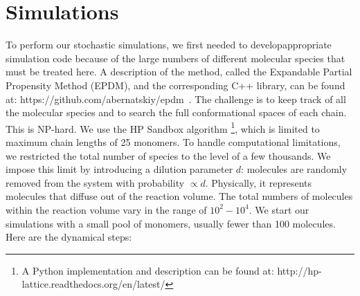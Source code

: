 \documentclass[5p,times]{elsarticle}
\begin{document}
 \section{Simulations}
To perform our stochastic simulations, we first needed to developappropriate simulation code 
because of the large numbers of different molecular species that must be treated here.  A 
description of the method, called the Expandable Partial Propensity Method (EPDM), and the 
corresponding C++ library, can be found at: https://github.com/abernatskiy/epdm~\cite{Guseva2016b}. 
The challenge is to keep track of all the molecular species and to search the full conformational 
spaces of each 
chain.  This is NP-hard.  We use the HP Sandbox algorithm\cite{lau1989lattice,Dill2008} \footnote{A 
Python implementation and description can be found at: 
http://hp-lattice.readthedocs.org/en/latest/}, which is limited to maximum chain lengths of 25 
monomers.  To handle computational limitations, we restricted the total number of species to the 
level of a few thousands.  We impose this limit by introducing a dilution parameter $d$: molecules 
are randomly removed from the system with probability $\propto d$.  Physically, it represents 
molecules that diffuse out of the reaction volume.  The total numbers of molecules within the 
reaction volume vary in the range of $10^2-10^4$.  We start our simulations with a small pool of 
monomers, usually fewer than 100 molecules.  Here are the dynamical steps:
\end{document}
